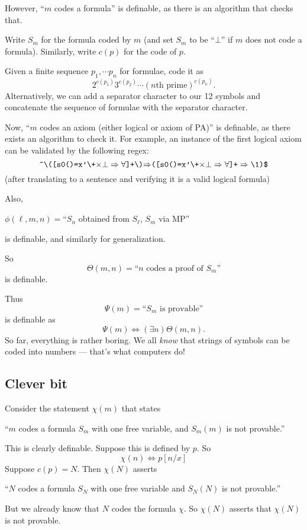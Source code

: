\documentclass[a4paper]{article}
\begin{document}
However, ``$m$ codes a formula'' is definable, as there is an algorithm that checks that.

Write $S_m$ for the formula coded by $m$ (and set $S_m$ to be ``$\bot$'' if $m$ does not code a formula). Similarly, write $c(p)$ for the code of $p$.

Given a finite sequence $p_1, \cdots p_n$ for formulae, code it as
\[
  2^{c(p_1)}3^{c(p_2)}\cdots (n\text{th prime})^{c(p_n)}.
\]
Alternatively, we can add a separator character to our 12 symbols and concatenate the sequence of formulae with the separator character.

Now, ``$m$ codes an axiom (either logical or axiom of PA)'' is definable, as there exists an algorithm to check it. For example, an instance of the first logical axiom can be validated by the following regex:
\[
  \verb/^\([s0()=x'\+/\mathtt{\times\bot\Rightarrow\forall}\verb/]+\)/\mathtt{\Rightarrow}\verb/([s0()=x'\+/\mathtt{\times\bot\Rightarrow\forall}\verb/]+/\Rightarrow\verb/\1)$/
\]
(after translating to a sentence and verifying it is a valid logical formula)

Also,
\begin{center}
  $\phi(\ell, m, n) = $``$S_n$ obtained from $S_\ell$, $S_m$ via MP''
\end{center}
is definable, and similarly for generalization.

So
\[
  \Theta(m, n) =\text{``}n\text{ codes a proof of }S_m\text{''}
\]
is definable.

Thus
\[
  \Psi(m) = \text{``}S_m\text{ is provable''}
\]
is definable as
\[
  \Psi(m) \Leftrightarrow (\exists n)\Theta(m, n).
\]
So far, everything is rather boring. We all \emph{know} that strings of symbols can be coded into numbers --- that's what computers do!

\subsection*{Clever bit}
Consider the statement $\chi(m)$ that states
\begin{center}
  ``$m$ codes a formula $S_m$ with one free variable, and $S_m(m)$ is not provable.''
\end{center}
This is clearly definable. Suppose this is defined by $p$. So
\[
  \chi(n) \Leftrightarrow p[n/x]
\]
Suppose $c(p) = N$. Then $\chi(N)$ asserts
\begin{center}
  ``$N$ codes a formula $S_N$ with one free variable and $S_N(N)$ is not provable.''
\end{center}
But we already know that $N$ codes the formula $\chi$. So $\chi(N)$ asserts that $\chi(N)$ is not provable.
\end{document}
